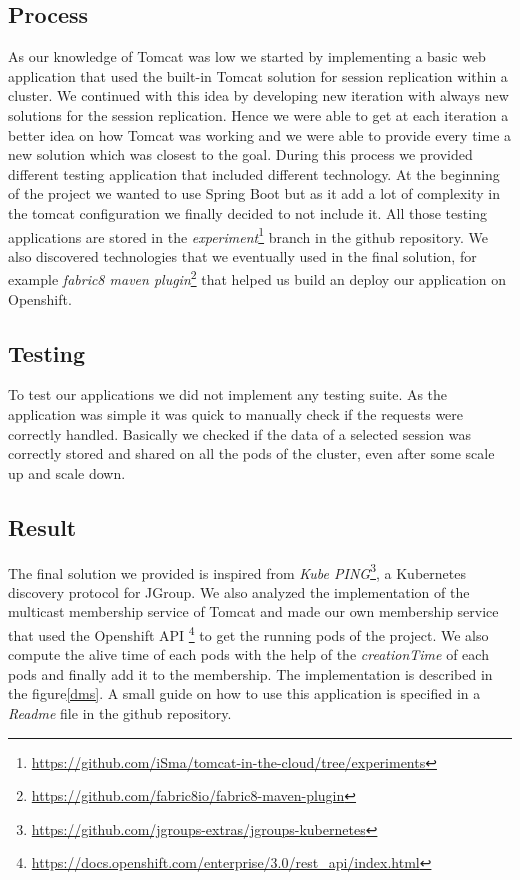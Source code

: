 \documentclass[11pt,a4paper]{article}
\begin{document}
\subsection{Process}
As our knowledge of Tomcat was low we started by implementing a basic web application that used the built-in Tomcat solution for session replication within a cluster. We continued with this idea by developing new iteration with always new solutions for the session replication. Hence we were able to get at each iteration a better idea on how Tomcat was working and we were able to provide every time a new solution which was closest to the goal. During this process we provided different testing application that included different technology. At the beginning of the project we wanted to use Spring Boot but as it add a lot of complexity in the tomcat configuration we finally decided to not include it. All those testing applications are stored in the \emph{experiment}\footnote{\url{https://github.com/iSma/tomcat-in-the-cloud/tree/experiments}} branch in the github repository. We also discovered technologies that we eventually used in the final solution, for example \emph{fabric8 maven plugin}\footnote{\url{https://github.com/fabric8io/fabric8-maven-plugin}} that helped us build an deploy our application on Openshift.

\subsection{Testing}
To test our applications we did not implement any testing suite. As the application was simple it was quick to manually check if the requests were correctly handled. Basically we checked if the data of a selected session was correctly stored and shared on all the pods of the cluster, even after some scale up and scale down.

\subsection{Result}
The final solution we provided is inspired from \emph{Kube PING}\footnote{\url{https://github.com/jgroups-extras/jgroups-kubernetes}}, a Kubernetes discovery protocol for JGroup. We also analyzed the implementation of the multicast membership service of Tomcat and made our own membership service that used the Openshift API \footnote{\url{https://docs.openshift.com/enterprise/3.0/rest_api/index.html}} to get the running pods of the project. We also compute the alive time of each pods with the help of the \emph{creationTime} of each pods and finally add it to the membership. The implementation is described in the figure\ref{dms}. A small guide on how to use this application is specified in a \emph{Readme} file in the github repository.
\end{document}
